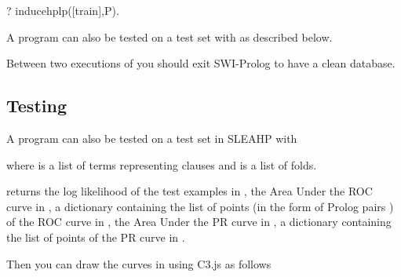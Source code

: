 \documentclass[letterpaper,10pt,english]{sphinxmanual}
\begin{document}
%
\begin{sphinxVerbatim}[commandchars=\\\{\}]
?\PYGZhy{} induce\PYGZus{}hplp([train],P).
\end{sphinxVerbatim}

A program can also be tested on a test set with   as described below.

Between two executions of  you should exit SWI-Prolog to have a clean database.


\subsection{Testing}
\label{\detokenize{index:testing}}
A program can also be tested on a test set in SLEAHP with

%
\begin{sphinxVerbatim}[commandchars=\\\{\}]
  
\end{sphinxVerbatim}

where  is a list of terms representing clauses and  is a list of folds.

 returns the log likelihood of the test examples in , the Area Under the ROC curve in , a dictionary containing the list of points (in the form of Prolog pairs ) of the ROC curve in , the Area Under the PR curve in , a dictionary containing the list of points of the PR curve in .

Then you can draw the curves in  using C3.js as follows

%
\begin{sphinxVerbatim}[commandchars=\\\{\}]
  
\end{sphinxVerbatim}
\end{document}
